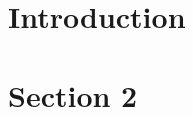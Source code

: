 \documentclass[twoside]{project}
\date{\today}
\begin{document}
\maketitle

\section*{Introduction}

\section*{Section 2}


\section*{}


\section*{}


\section*{}


{}

\end{document}
